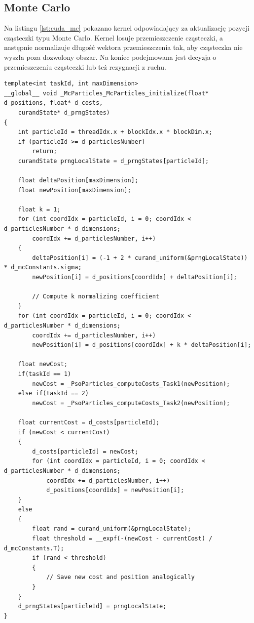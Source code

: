 \documentclass[11pt, a4paper, oneside]{article}
\begin{document}
\subsection{Monte Carlo}
Na listingu \ref{lst:cuda_mc} pokazano kernel odpowiadający za aktualizację pozycji cząsteczki typu Monte Carlo. Kernel losuje przemieszczenie cząsteczki, a następnie normalizuje długość wektora przemieszczenia tak, aby cząsteczka nie wyszła poza dozwolony obszar. Na koniec podejmowana jest decyzja o przemieszczeniu cząsteczki lub też rezygnacji z ruchu.

\begin{lstlisting}[style=mycpp, label=lst:cuda_mc, caption={Kernel CUDA aktualizujący cząsteczkę Monte Carlo.}]
template<int taskId, int maxDimension>
__global__ void _McParticles_McParticles_initialize(float* d_positions, float* d_costs,
	curandState* d_prngStates)
{
	int particleId = threadIdx.x + blockIdx.x * blockDim.x;
	if (particleId >= d_particlesNumber)
		return;
	curandState prngLocalState = d_prngStates[particleId];

	float deltaPosition[maxDimension];
	float newPosition[maxDimension];

	float k = 1;
	for (int coordIdx = particleId, i = 0; coordIdx < d_particlesNumber * d_dimensions;
		coordIdx += d_particlesNumber, i++)
	{
		deltaPosition[i] = (-1 + 2 * curand_uniform(&prngLocalState)) * d_mcConstants.sigma;
		newPosition[i] = d_positions[coordIdx] + deltaPosition[i];

		// Compute k normalizing coefficient
	}
	for (int coordIdx = particleId, i = 0; coordIdx < d_particlesNumber * d_dimensions;
		coordIdx += d_particlesNumber, i++)
		newPosition[i] = d_positions[coordIdx] + k * deltaPosition[i];

	float newCost;
	if(taskId == 1)
		newCost = _PsoParticles_computeCosts_Task1(newPosition);
	else if(taskId == 2)
		newCost = _PsoParticles_computeCosts_Task2(newPosition);

	float currentCost = d_costs[particleId];
	if (newCost < currentCost)
	{
		d_costs[particleId] = newCost;
		for (int coordIdx = particleId, i = 0; coordIdx < d_particlesNumber * d_dimensions;
			coordIdx += d_particlesNumber, i++)
			d_positions[coordIdx] = newPosition[i];
	}
	else
	{
		float rand = curand_uniform(&prngLocalState);
		float threshold = __expf(-(newCost - currentCost) / d_mcConstants.T);
		if (rand < threshold)
		{
			// Save new cost and position analogically
		}
	}
	d_prngStates[particleId] = prngLocalState;
}
\end{lstlisting}
\end{document}
